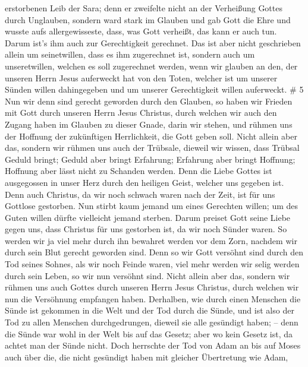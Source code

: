 erstorbenen Leib der Sara;  denn er zweifelte nicht an der
Verheißung Gottes durch Unglauben, sondern ward stark im Glauben und gab
Gott die Ehre  und wusste aufs allergewisseste, dass, was
Gott verheißt, das kann er auch tun.  Darum ist's ihm auch
zur Gerechtigkeit gerechnet.  Das ist aber nicht
geschrieben allein um seinetwillen, dass es ihm zugerechnet ist,
 sondern auch um unseretwillen, welchen es soll zugerechnet
werden, wenn wir glauben an den, der unseren Herrn Jesus auferweckt hat
von den Toten,  welcher ist um unserer Sünden willen
dahingegeben und um unserer Gerechtigkeit willen auferweckt. \# 5
 Nun wir denn sind gerecht geworden durch den Glauben, so
haben wir Frieden mit Gott durch unseren Herrn Jesus Christus,
 durch welchen wir auch den Zugang haben im Glauben zu
dieser Gnade, darin wir stehen, und rühmen uns der Hoffnung der
zukünftigen Herrlichkeit, die Gott geben soll.  Nicht allein
aber das, sondern wir rühmen uns auch der Trübsale, dieweil wir wissen,
dass Trübsal Geduld bringt;  Geduld aber bringt Erfahrung;
Erfahrung aber bringt Hoffnung;  Hoffnung aber lässt nicht
zu Schanden werden. Denn die Liebe Gottes ist ausgegossen in unser Herz
durch den heiligen Geist, welcher uns gegeben ist.  Denn
auch Christus, da wir noch schwach waren nach der Zeit, ist für uns
Gottlose gestorben.  Nun stirbt kaum jemand um eines
Gerechten willen; um des Guten willen dürfte vielleicht jemand sterben.
 Darum preiset Gott seine Liebe gegen uns, dass Christus für
uns gestorben ist, da wir noch Sünder waren.  So werden wir
ja viel mehr durch ihn bewahret werden vor dem Zorn, nachdem wir durch
sein Blut gerecht geworden sind.  Denn so wir Gott versöhnt
sind durch den Tod seines Sohnes, als wir noch Feinde waren, viel mehr
werden wir selig werden durch sein Leben, so wir nun versöhnt sind.
 Nicht allein aber das, sondern wir rühmen uns auch Gottes
durch unseren Herrn Jesus Christus, durch welchen wir nun die Versöhnung
empfangen haben.  Derhalben, wie durch einen Menschen die
Sünde ist gekommen in die Welt und der Tod durch die Sünde, und ist also
der Tod zu allen Menschen durchgedrungen, dieweil sie alle gesündigt
haben; --  denn die Sünde war wohl in der Welt bis auf das
Gesetz; aber wo kein Gesetz ist, da achtet man der Sünde nicht.
 Doch herrschte der Tod von Adam an bis auf Moses auch über
die, die nicht gesündigt haben mit gleicher Übertretung wie Adam,
